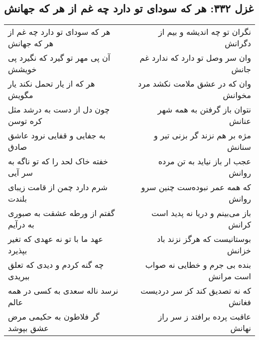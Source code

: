 \begin{center}
\section*{غزل ۳۳۲: هر که سودای تو دارد چه غم از هر که جهانش}
\label{sec:332}
\begin{longtable}{l p{0.5cm} r}
هر که سودای تو دارد چه غم از هر که جهانش
&&
نگران تو چه اندیشه و بیم از دگرانش
\\
آن پی مهر تو گیرد که نگیرد پی خویشش
&&
وان سر وصل تو دارد که ندارد غم جانش
\\
هر که از یار تحمل نکند یار مگویش
&&
وان که در عشق ملامت نکشد مرد مخوانش
\\
چون دل از دست به درشد مثل کره توسن
&&
نتوان باز گرفتن به همه شهر عنانش
\\
به جفایی و قفایی نرود عاشق صادق
&&
مژه بر هم نزند گر بزنی تیر و سنانش
\\
خفته خاک لحد را که تو ناگه به سر آیی
&&
عجب ار باز نیاید به تن مرده روانش
\\
شرم دارد چمن از قامت زیبای بلندت
&&
که همه عمر نبوده‌ست چنین سرو روانش
\\
گفتم از ورطه عشقت به صبوری به درآیم
&&
باز می‌بینم و دریا نه پدید است کرانش
\\
عهد ما با تو نه عهدی که تغیر بپذیرد
&&
بوستانیست که هرگز نزند باد خزانش
\\
چه گنه کردم و دیدی که تعلق ببریدی
&&
بنده بی جرم و خطایی نه صواب است مرانش
\\
نرسد ناله سعدی به کسی در همه عالم
&&
که نه تصدیق کند کز سر دردیست فغانش
\\
گر فلاطون به حکیمی مرض عشق بپوشد
&&
عاقبت پرده برافتد ز سر راز نهانش
\\
\end{longtable}
\end{center}
